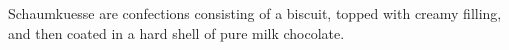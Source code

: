 Schaumkuesse are confections consisting of a biscuit, topped with creamy filling, and then coated in a hard shell of pure milk chocolate.